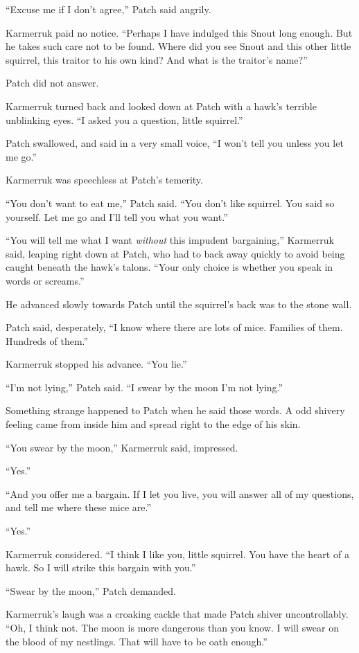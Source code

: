 \documentclass[ebook,oneside,openany,12pt]{memoir}
\begin{document}
“Excuse me if I don’t agree,” Patch said angrily.

Karmerruk paid no notice. “Perhaps I have indulged this Snout long
enough. But he takes such care not to be found. Where did you see
Snout and this other little squirrel, this traitor to his own kind?
And what is the traitor’s name?”

Patch did not answer.

Karmerruk turned back and looked down at Patch with a hawk’s terrible
unblinking eyes. “I asked you a question, little squirrel.”

Patch swallowed, and said in a very small voice, “I won’t tell you
unless you let me go.”

Karmerruk was speechless at Patch’s temerity.

“You don’t want to eat me,” Patch said. “You don’t like squirrel. You
said so yourself. Let me go and I’ll tell you what you want.”

“You will tell me what I want \emph{without} this impudent
bargaining,” Karmerruk said, leaping right down at Patch, who had to
back away quickly to avoid being caught beneath the hawk’s
talons. “Your only choice is whether you speak in words or screams.”

He advanced slowly towards Patch until the squirrel’s back was to the
stone wall.

Patch said, desperately, “I know where there are lots of
mice. Families of them. Hundreds of them.”

Karmerruk stopped his advance. “You lie.”

“I’m not lying,” Patch said. “I swear by the moon I’m not lying.”

Something strange happened to Patch when he said those words. A odd
shivery feeling came from inside him and spread right to the edge of
his skin.

“You swear by the moon,” Karmerruk said, impressed.

“Yes.”

“And you offer me a bargain. If I let you live, you will answer all of
my questions, and tell me where these mice are.”

“Yes.”

Karmerruk considered. “I think I like you, little squirrel. You have
the heart of a hawk. So I will strike this bargain with you.”

“Swear by the moon,” Patch demanded.

Karmerruk’s laugh was a croaking cackle that made Patch shiver
uncontrollably. “Oh, I think not. The moon is more dangerous than you
know. I will swear on the blood of my nestlings. That will have to be
oath enough.”
\end{document}
